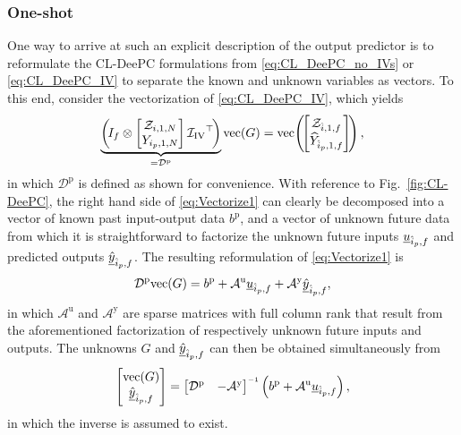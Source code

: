 \subsubsection{One-shot}
One way to arrive at such an explicit description of the output predictor is to reformulate the \ac{CL-DeePC} formulations from \eqref{eq:CL_DeePC_no_IVs} or \eqref{eq:CL_DeePC_IV} to separate the known and unknown variables as vectors. To this end, consider the vectorization of \eqref{eq:CL_DeePC_IV}, which yields
\begin{align}\label{eq:Vectorize1}
    \underbrace{\left(\mkern-3mu I_f \otimes \begin{bmatrix}
        \mathcal{Z}_{i,1,N}\\
        Y_{i_p,1,N}
    \end{bmatrix}{\mathcal{I}_\mathrm{IV}}^\top\mkern-3mu\right)}_{=\mathcal{D}^\mathrm{p}}\text{vec}(G)=\text{vec}\mkern-3mu\left(\mkern-3mu\begin{bmatrix}
        \mathcal{Z}_{\hat{i},1,f}\\
        \widehat{Y}_{\hat{i}_p,1,f}
    \end{bmatrix}\mkern-3mu\right),
\end{align}%
in which $\mathcal{D}^\mathrm{p}$ is defined as shown for convenience. With reference to Fig.~\ref{fig:CL-DeePC}, the right hand side of \eqref{eq:Vectorize1} can clearly be decomposed into a vector of known past input-output data $b^\mathrm{p}$, and a vector of unknown future data from which it is straightforward to factorize the unknown future inputs $\underline{u}_{\hat{i}_p,f}$ and predicted outputs $\underline{\hat{y}}_{\hat{i}_p,f}$. The resulting reformulation of \eqref{eq:Vectorize1} is
\begin{align}
    \mathcal{D}^\mathrm{p}\text{vec}(G) = b^\mathrm{p}+\mathcal{A}^\mathrm{u}\underline{u}_{\hat{i}_p,f} + \mathcal{A}^\mathrm{y}\underline{\hat{y}}_{\hat{i}_p,f},
\end{align}
in which $\mathcal{A}^\mathrm{u}$ and $\mathcal{A}^\mathrm{y}$ are sparse matrices with full column rank that result from the aforementioned factorization of respectively unknown future inputs and outputs. The unknowns $G$ and $\underline{\hat{y}}_{\hat{i}_p,f}$ can then be obtained simultaneously from
\begin{align}
    \begin{bmatrix}
        \text{vec}(G)\\
        \datavec{\hat{y}}{\hat{i}_p,f}
    \end{bmatrix} =
    \begin{bmatrix}
        \mathcal{D}^\mathrm{p} & -\mathcal{A}^\mathrm{y}
    \end{bmatrix}\inv \left(b^\mathrm{p} + \mathcal{A}^\mathrm{u}\datavec{u}{\hat{i}_p,f}\right),
\end{align}
in which the inverse is assumed to exist.
%
